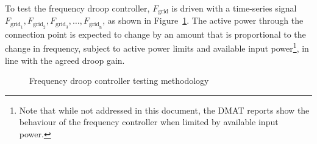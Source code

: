 To test the frequency droop controller, $F_{\mathrm{grid}}$ is driven with a time-series signal $F_{\mathrm{grid}_{\mathrm{1}}}, F_{\mathrm{grid}_{\mathrm{2}}}, F_{\mathrm{grid}_{\mathrm{3}}}, \dots, F_{\mathrm{grid}_{\mathrm{n}}}$, as shown in Figure~\ref{fig:s52511-methodology}. The active power through the connection point is expected to change by an amount that is proportional to the change in frequency, subject to active power limits and available input power\footnote{Note that while not addressed in this document, the \ac{DMAT} reports show the behaviour of the frequency controller when limited by available input power.}, in line with the agreed droop gain.


\begin{figure}[H]
	\centering
	
	\caption{Frequency droop controller testing methodology}
	\label{fig:s52511-methodology}
\end{figure}